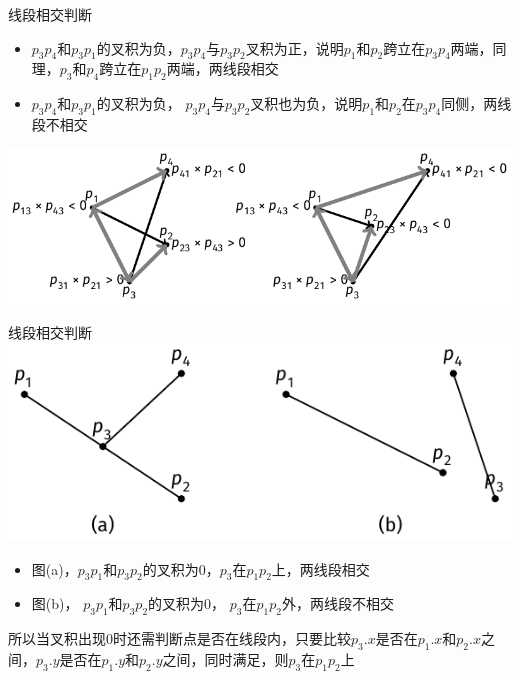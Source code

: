\begin{frame}{线段相交判断}
    \begin{itemize}
        \item $p_3p_4$和$p_3p_1$的叉积为负，$p_3p_4$与$p_3p_2$叉积为正，说明$p_1$和$p_2$跨立在$p_3p_4$两端，同理，$p_3$和$p_4$跨立在$p_1p_2$两端，两线段相交
        \item $p_3p_4$和$p_3p_1$的叉积为负， $p_3p_4$与$p_3p_2$叉积也为负，说明$p_1$和$p_2$在$p_3p_4$同侧，两线段不相交
    \end{itemize}  
    \vfill
    \includegraphics[scale=.8]{fig/9-2.pdf}
\end{frame}
\begin{frame}{线段相交判断}
    \includegraphics[center]{fig/9-3.pdf}
    \begin{itemize}
        \item 图(a)，$p_3p_1$和$p_3p_2$的叉积为0，$p_3$在$p_1p_2$上，两线段相交
        \item 图(b)， $p_3p_1$和$p_3p_2$的叉积为0， $p_3$在$p_1p_2$外，两线段不相交
    \end{itemize}  
    所以当叉积出现0时还需判断点是否在线段内，只要比较$p_3.x$是否在$p_1.x$和$p_2.x$之间，$p_3.y$是否在$p_1.y$和$p_2.y$之间，同时满足，则$p_3$在$p_1p_2$上
\end{frame}
